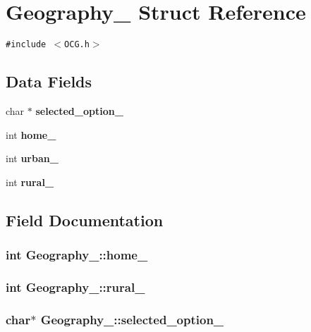 \section{Geography\_\- Struct Reference}
\label{structGeography__}
{\tt \#include $<$OCG.h$>$}

\subsection*{Data Fields}
\begin{CompactItemize}
\item 
char $\ast$ {\bf selected\_\-option\_\-}
\item 
int {\bf home\_\-}
\item 
int {\bf urban\_\-}
\item 
int {\bf rural\_\-}
\end{CompactItemize}


\subsection{Field Documentation}
\subsubsection[{home\_\-}]{\setlength{\rightskip}{0pt plus 5cm}int {\bf Geography\_\-::home\_\-}}\label{structGeography___fc023b62d41ae32439c5f7c58312a336}


\subsubsection[{rural\_\-}]{\setlength{\rightskip}{0pt plus 5cm}int {\bf Geography\_\-::rural\_\-}}\label{structGeography___f68cf3ebd8f1e133378cf6f54441e631}


\subsubsection[{selected\_\-option\_\-}]{\setlength{\rightskip}{0pt plus 5cm}char$\ast$ {\bf Geography\_\-::selected\_\-option\_\-}}\label{structGeography___9f1c95b996aac5a32c05f7fdbeafd539}


